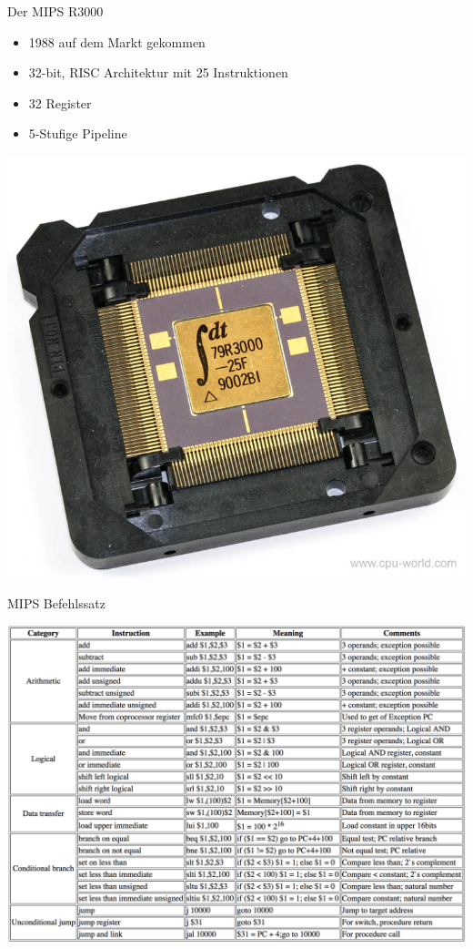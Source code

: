 \begin{frame}{Der MIPS R3000}
\begin{itemize}
       \item 1988 auf dem Markt gekommen
       \item 32-bit, RISC Architektur mit 25 Instruktionen
		\item 32 Register
		\item 5-Stufige Pipeline
\end{itemize}

\begin{center}
\includegraphics[scale=0.22]{R3000.jpg}
\end{center}

\end{frame}

\begin{frame}{MIPS Befehlssatz}
\begin{center}
\includegraphics[keepaspectratio=true,width=0.85\paperwidth]{ISA.png}
\end{center}

\end{frame}

